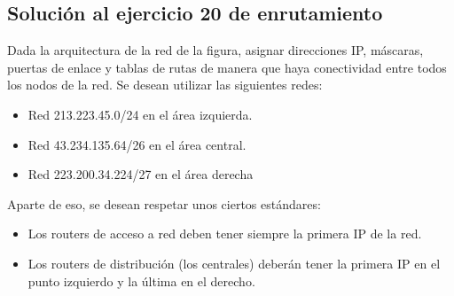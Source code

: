 \documentclass[letterpaper,10pt,spanish]{sphinxmanual}
\begin{document}
\subsection{Solución al ejercicio 20 de enrutamiento}
\label{\detokenize{t2_integracion_elementos/ejercicios_subredes_ipv4/ejercicios_dos_router:solucion-al-ejercicio-20-de-enrutamiento}}
\sphinxAtStartPar
Dada la arquitectura de la red de la figura, asignar direcciones IP, máscaras, puertas de enlace y tablas de rutas de manera que haya conectividad entre todos
los nodos de la red. Se desean utilizar las siguientes redes:
\begin{itemize}
\item {} 
\sphinxAtStartPar
Red 213.223.45.0/24 en el área izquierda.

\item {} 
\sphinxAtStartPar
Red 43.234.135.64/26 en el área central.

\item {} 
\sphinxAtStartPar
Red 223.200.34.224/27 en el área derecha

\end{itemize}

\begin{figure}[htbp]
\centering

\noindent{}
\end{figure}

\sphinxAtStartPar
Aparte de eso, se desean respetar unos ciertos estándares:
\begin{itemize}
\item {} 
\sphinxAtStartPar
Los routers de acceso a red deben tener siempre la primera IP de la red.

\item {} 
\sphinxAtStartPar
Los routers de distribución (los centrales) deberán tener la primera IP en el punto izquierdo y la última en el derecho.

\end{itemize}
\end{document}
